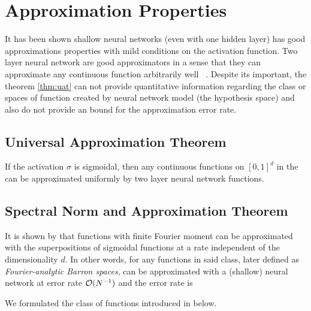 \chapter{Approximation Properties}

It has been shown shallow neural networks (even with one hidden layer) has good 
approximations properties with mild conditions on the activation function. Two
layer neural network are good approximators in a sense that they can approximate
any continuous function arbitrarily well ~\cite{cybenkoApproximationSuperpositionsSigmoidal1989}. 
Despite its important, the theorem \ref{thm:uat} can not provide quantitative 
information regarding the class or spaces of function created by neural network
model (the hypothesis space) and also do not provide an bound for the approximation 
error rate. 

\section{Universal Approximation Theorem}

\begin{theorem}\label{thm:uat}
    \cite[Theorem 5]{cybenkoApproximationSuperpositionsSigmoidal1989} If the activation $\sigma$ is sigmoidal,
    then any continuous functions on $[0, 1]^d$ in the can be approximated 
    uniformly by two layer neural network functions. 
\end{theorem}


\section{Spectral Norm and Approximation Theorem}

It is shown by \cite{barronUniversalApproximationBounds1993} that functions with finite Fourier moment 
can be approximated with the superpositions of sigmoidal functions at a rate 
independent of the dimensionality $d$. In other words, for any functions in said
class,  later defined as \textit{Fourier-analytic Barron spaces}, can be approximated
with a (shallow) neural network at error rate $\mathcal{O}(N^{-1})$ and the error rate is

We formulated the class of functions introduced in \cite{barronNeuralNetApproximation1992, barronUniversalApproximationBounds1993} below. 

